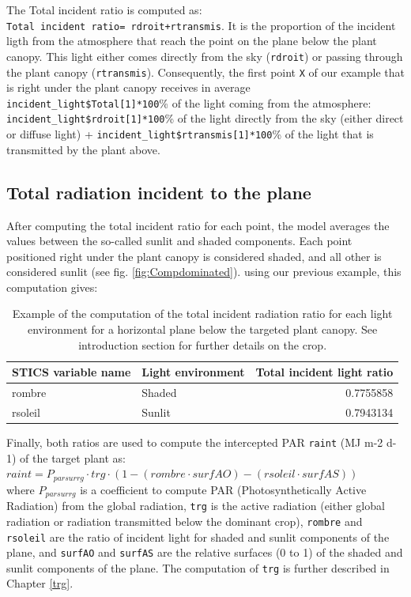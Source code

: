 \documentclass[]{book}
\theoremstyle{definition}
\theoremstyle{definition}
\theoremstyle{definition}
\theoremstyle{remark}
\begin{document}
The Total incident ratio is computed as:
\texttt{Total\ incident\ ratio=\ rdroit+rtransmis}. It is the proportion
of the incident ligth from the atmosphere that reach the point on the
plane below the plant canopy. This light either comes directly from the
sky (\texttt{rdroit}) or passing through the plant canopy
(\texttt{rtransmis}). Consequently, the first point \texttt{X} of our
example that is right under the plant canopy receives in average
\texttt{incident\_light\$Total{[}1{]}*100}\% of the light coming from
the atmosphere: \texttt{incident\_light\$rdroit{[}1{]}*100}\% of the
light directly from the sky (either direct or diffuse light) +
\texttt{incident\_light\$rtransmis{[}1{]}*100}\% of the light that is
transmitted by the plant above.

\subsection{Total radiation incident to the
plane}\label{total-radiation-incident-to-the-plane}

After computing the total incident ratio for each point, the model
averages the values between the so-called sunlit and shaded components.
Each point positioned right under the plant canopy is considered shaded,
and all other is considered sunlit (see fig. \ref{fig:Compdominated}).
using our previous example, this computation gives:

\begin{table}

\caption{\label{tab:unnamed-chunk-6}Example of the computation of the total incident radiation ratio for each light environment for a horizontal plane below the targeted plant canopy. See introduction section for further details on the crop.}
\centering
\begin{tabular}[t]{l|l|r}
\hline
STICS variable name & Light environment & Total incident light ratio\\
\hline
rombre & Shaded & 0.7755858\\
\hline
rsoleil & Sunlit & 0.7943134\\
\hline
\end{tabular}
\end{table}

Finally, both ratios are used to compute the intercepted PAR
\texttt{raint} (MJ m-2 d-1) of the target plant as:\\
\(raint=P_{parsurrg}\cdot trg\cdot(1-(rombre\cdot surfAO)-(rsoleil\cdot surfAS))\)\\
where \(P_{parsurrg}\) is a coefficient to compute PAR
(Photosynthetically Active Radiation) from the global radiation,
\texttt{trg} is the active radiation (either global radiation or
radiation transmitted below the dominant crop), \texttt{rombre} and
\texttt{rsoleil} are the ratio of incident light for shaded and sunlit
components of the plane, and \texttt{surfAO} and \texttt{surfAS} are the
relative surfaces (0 to 1) of the shaded and sunlit components of the
plane. The computation of \texttt{trg} is further described in Chapter
\ref{trg}.
\end{document}
